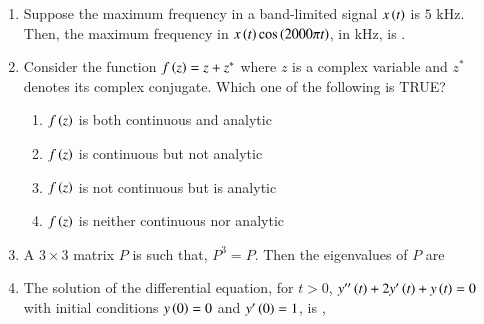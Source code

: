 \documentclass[journal,12pt,onecolumn]{IEEEtran}
\theoremstyle{remark}
\begin{document}
\begin{enumerate}[start=1, label=Q.\arabic*]
    \hfill{}

    \item Suppose the maximum frequency in a band-limited signal $x\left(t\right)$ is $5$ kHz. Then, the maximum frequency in $x\left(t\right)\cos\left(2000\pi t\right)$, in kHz, is \underline{\hspace{2cm}}.

    \hfill{}

    \item Consider the function $f\left(z\right) = z + z^*$ where $z$ is a complex variable and $z^*$ denotes its complex conjugate. Which one of the following is TRUE?
    \begin{enumerate}
        \item $f\left(z\right)$ is both continuous and analytic
        \item $f\left(z\right)$ is continuous but not analytic
        \item $f\left(z\right)$ is not continuous but is analytic
        \item $f\left(z\right)$ is neither continuous nor analytic
    \end{enumerate}

    \hfill{}

    \item A $3 \times 3$ matrix $P$ is such that, $P^3=P$. Then the eigenvalues of $P$ are
    \begin{enumerate}
    \end{enumerate}

    \hfill{}

    \item The solution of the differential equation, for $t>0$, $y''\left(t\right) + 2y'\left(t\right) + y\left(t\right) = 0$ with initial conditions $y\left(0\right)=0$ and $y'\left(0\right)=1$, is ,
    \begin{enumerate}
    \end{enumerate}


\end{enumerate}
\end{document}
